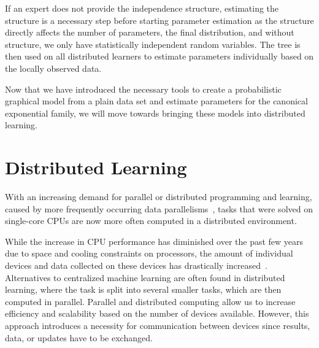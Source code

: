 If an expert does not provide the independence structure, estimating the structure is a necessary step before starting parameter estimation as the structure directly affects the number of parameters, the final distribution, and without structure, we only have statistically independent random variables. 
The tree is then used on all distributed learners to estimate parameters individually based on the locally observed data. 

Now that we have introduced the necessary tools to create a probabilistic graphical model from a plain data set and estimate parameters for the canonical exponential family, we will move towards bringing these models into distributed learning.


\section{Distributed Learning}
With an increasing demand for parallel or distributed programming and learning, caused by more frequently occurring data parallelisms~\cite{ben2006principles}, tasks that were solved on single-core CPUs are now more often computed in a distributed environment.

While the increase in CPU performance has diminished over the past few years~\cite{herlihy2011art} due to space and cooling constraints on processors, the amount of individual devices and data collected on these devices has drastically increased~\cite{kaisler2013big}.
Alternatives to centralized machine learning are often found in distributed learning, where the task is split into several smaller tasks, which are then computed in parallel. 
Parallel and distributed computing allow us to increase efficiency and scalability based on the number of devices available.
However, this approach introduces a necessity for communication between devices since results, data, or updates have to be exchanged.

